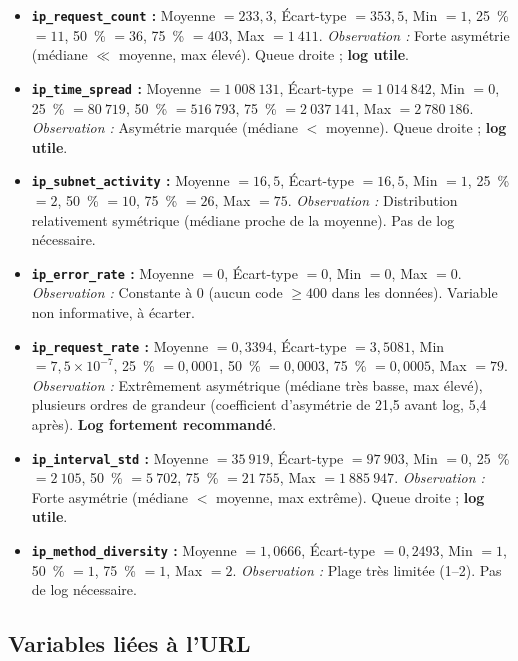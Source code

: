 \documentclass[a4paper,12pt]{article}
\begin{document}
\begin{itemize}
  \item \textbf{\texttt{ip\_request\_count} :} Moyenne $= 233{,}3$, Écart-type $= 353{,}5$, Min $= 1$, 25~\% $= 11$, 50~\% $= 36$, 75~\% $= 403$, Max $= 1~411$. \emph{Observation :} Forte asymétrie (médiane $\ll$ moyenne, max élevé). Queue droite ; \textbf{log utile}.
  \item \textbf{\texttt{ip\_time\_spread} :} Moyenne $= 1~008~131$, Écart-type $= 1~014~842$, Min $= 0$, 25~\% $= 80~719$, 50~\% $= 516~793$, 75~\% $= 2~037~141$, Max $= 2~780~186$. \emph{Observation :} Asymétrie marquée (médiane $<$ moyenne). Queue droite ; \textbf{log utile}.
  \item \textbf{\texttt{ip\_subnet\_activity} :} Moyenne $= 16{,}5$, Écart-type $= 16{,}5$, Min $= 1$, 25~\% $= 2$, 50~\% $= 10$, 75~\% $= 26$, Max $= 75$. \emph{Observation :} Distribution relativement symétrique (médiane proche de la moyenne). Pas de log nécessaire.
  \item \textbf{\texttt{ip\_error\_rate} :} Moyenne $= 0$, Écart-type $= 0$, Min $= 0$, Max $= 0$. \emph{Observation :} Constante à 0 (aucun code $\geq 400$ dans les données). Variable non informative, à écarter.
  \item \textbf{\texttt{ip\_request\_rate} :} Moyenne $= 0{,}3394$, Écart-type $= 3{,}5081$, Min $= 7{,}5\times 10^{-7}$, 25~\% $= 0{,}0001$, 50~\% $= 0{,}0003$, 75~\% $= 0{,}0005$, Max $= 79$. \emph{Observation :} Extrêmement asymétrique (médiane très basse, max élevé), plusieurs ordres de grandeur (coefficient d'asymétrie de 21,5 avant log, 5,4 après). \textbf{Log fortement recommandé}.
  \item \textbf{\texttt{ip\_interval\_std} :} Moyenne $= 35~919$, Écart-type $= 97~903$, Min $= 0$, 25~\% $= 2~105$, 50~\% $= 5~702$, 75~\% $= 21~755$, Max $= 1~885~947$. \emph{Observation :} Forte asymétrie (médiane $<$ moyenne, max extrême). Queue droite ; \textbf{log utile}.
  \item \textbf{\texttt{ip\_method\_diversity} :} Moyenne $= 1{,}0666$, Écart-type $= 0{,}2493$, Min $= 1$, 50~\% $= 1$, 75~\% $= 1$, Max $= 2$. \emph{Observation :} Plage très limitée (1--2). Pas de log nécessaire.
\end{itemize}

\subsection{Variables liées à l'URL}
\end{document}
